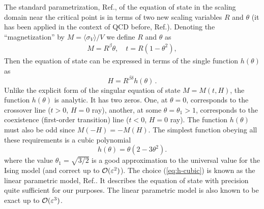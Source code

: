 \documentclass[prl,twocolumn,nofootinbib]{revtex4}
\newcommand\la{\langle}
\newcommand\ra{\rangle}
\newcommand\cO{{\cal O}}
\begin{document}
The standard parametrization, Ref.\cite{Zinn-Justin}, of the equation
of state in the scaling domain near the critical point is in terms of
two new scaling variables $R$ and $\theta$ (it has been applied in
the context of QCD before, Ref.\cite{Nonaka:2004pg}). Denoting
the ``magnetization'' by $M=\la\sigma_V\ra/V$ we define $R$ and
$\theta$ as
\begin{align}
  \label{eq:param}
M = R^\beta\theta,
\quad
t = R (1-\theta^2),
\end{align}
Then the equation of state can be expressed in terms of the single
function $h(\theta)$ as
\begin{equation}
  \label{eq:H-h}
  H = R^{\beta\delta}h(\theta)\,.
\end{equation}
Unlike the explicit form of the singular equation of state $M=M(t,H)$,
the function $h(\theta)$ is analytic. It has two zeros. One, at
$\theta=0$, corresponds to the crossover line ($t>0$, $H=0$ ray), another,
at some $\theta=\theta_1>1$, corresponds to the coexistence
(first-order transition) line ($t<0$, $H=0$ ray).  The function $h(\theta)$ must
also be odd since $M(-H)=-M(H)$.  The simplest function obeying all
these requirements is a cubic polynomial
\begin{equation}
  \label{eq:h-cubic}
  h(\theta) = \theta(2-3\theta^2).
\end{equation}
where the value $\theta_1=\sqrt{3/2}$ is a good approximation to the
universal value for the Ising model (and
correct up to $\cO(\varepsilon^2)$).
The choice (\ref{eq:h-cubic}) is known as  the
linear parametric model, Ref.\cite{Schofield:1969}. It
describes the equation of state with precision quite sufficient for 
our purposes. The linear parametric model
is also known to be exact up to $\cO(\varepsilon^3)$.%
\end{document}
